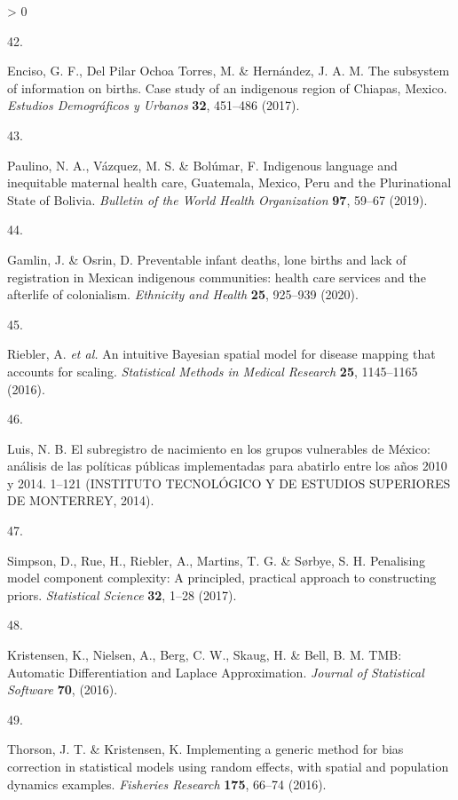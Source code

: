 \documentclass[
]{article}
\newlength{\cslhangindent}
\newlength{\csllabelwidth}
\newenvironment{CSLReferences}[2] %
 {%
  \setlength{\parindent}{0pt}
  \ifodd #1 \everypar{\setlength{\hangindent}{\cslhangindent}}\ignorespaces\fi
  \ifnum #2 > 0
  \setlength{\parskip}{#2\baselineskip}
  \fi
 }%
 {}
\newcommand{\CSLLeftMargin}[1]{\parbox[t]{\csllabelwidth}{#1}}
\newcommand{\CSLRightInline}[1]{\parbox[t]{\linewidth - \csllabelwidth}{#1}\break}
\begin{document}
\begin{CSLReferences}{0}{0}
\leavevmode\hypertarget{ref-Enciso2017}{}%
\CSLLeftMargin{42. }
\CSLRightInline{Enciso, G. F., Del Pilar Ochoa Torres, M. \& Hernández, J. A. M. {The subsystem of information on births. Case study of an indigenous region of Chiapas, Mexico}. \emph{Estudios Demogr{á}ficos y Urbanos} \textbf{32}, 451--486 (2017).}

\leavevmode\hypertarget{ref-Paulino2019}{}%
\CSLLeftMargin{43. }
\CSLRightInline{Paulino, N. A., Vázquez, M. S. \& Bolúmar, F. {Indigenous language and inequitable maternal health care, Guatemala, Mexico, Peru and the Plurinational State of Bolivia}. \emph{Bulletin of the World Health Organization} \textbf{97}, 59--67 (2019).}

\leavevmode\hypertarget{ref-Gamlin2020}{}%
\CSLLeftMargin{44. }
\CSLRightInline{Gamlin, J. \& Osrin, D. {Preventable infant deaths, lone births and lack of registration in Mexican indigenous communities: health care services and the afterlife of colonialism}. \emph{Ethnicity and Health} \textbf{25}, 925--939 (2020).}

\leavevmode\hypertarget{ref-Riebler2016}{}%
\CSLLeftMargin{45. }
\CSLRightInline{Riebler, A. \emph{et al.} {An intuitive Bayesian spatial model for disease mapping that accounts for scaling}. \emph{Statistical Methods in Medical Research} \textbf{25}, 1145--1165 (2016).}

\leavevmode\hypertarget{ref-Luis2014}{}%
\CSLLeftMargin{46. }
\CSLRightInline{Luis, N. B. {El subregistro de nacimiento en los grupos vulnerables de M{é}xico: an{á}lisis de las pol{í}ticas p{ú}blicas implementadas para abatirlo entre los a{ñ}os 2010 y 2014}. 1--121 (INSTITUTO TECNOL{Ó}GICO Y DE ESTUDIOS SUPERIORES DE MONTERREY, 2014).}

\leavevmode\hypertarget{ref-Simpson2017}{}%
\CSLLeftMargin{47. }
\CSLRightInline{Simpson, D., Rue, H., Riebler, A., Martins, T. G. \& Sørbye, S. H. {Penalising model component complexity: A principled, practical approach to constructing priors}. \emph{Statistical Science} \textbf{32}, 1--28 (2017).}

\leavevmode\hypertarget{ref-Kristensen2016}{}%
\CSLLeftMargin{48. }
\CSLRightInline{Kristensen, K., Nielsen, A., Berg, C. W., Skaug, H. \& Bell, B. M. {TMB: Automatic Differentiation and Laplace Approximation}. \emph{Journal of Statistical Software} \textbf{70}, (2016).}

\leavevmode\hypertarget{ref-Thorson2016}{}%
\CSLLeftMargin{49. }
\CSLRightInline{Thorson, J. T. \& Kristensen, K. {Implementing a generic method for bias correction in statistical models using random effects, with spatial and population dynamics examples}. \emph{Fisheries Research} \textbf{175}, 66--74 (2016).}


\end{CSLReferences}
\end{document}
